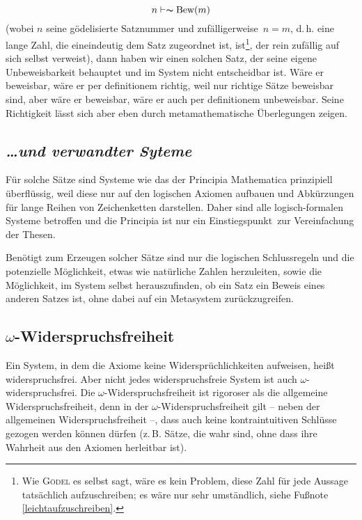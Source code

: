 $$
n \vdash \thicksim \text{Bew}\left(m\right)
$$
(wobei $n$ seine gödelisierte Satznummer und \frq zufälligerweise\flq\ $n = m$,
d.\,h. eine lange Zahl, die eineindeutig dem
Satz zugeordnet ist, ist\footnote{Wie \textsc{Gödel} es selbst sagt, wäre es kein
Problem, diese Zahl für jede Aussage tatsächlich
aufzuschreiben; es wäre nur sehr umständlich,
siehe Fußnote \ref{leichtaufzuschreiben}.}, der rein zufällig auf sich selbst verweist),
dann haben wir einen solchen Satz, der seine eigene Unbeweisbarkeit
behauptet und im System nicht entscheidbar ist. Wäre er beweisbar, wäre er per definitionem
richtig, weil nur richtige Sätze beweisbar sind, aber wäre er beweisbar, wäre er auch
per definitionem unbeweisbar. Seine Richtigkeit lässt sich aber eben durch
metamathematische Überlegungen zeigen.

\subsection*{\frq\textit{\dots und verwandter Syteme}\flq}

Für solche Sätze sind Systeme wie das der Principia Mathematica prinzipiell
überflüssig,
weil diese nur auf den logischen Axiomen aufbauen und Abkürzungen für lange Reihen von
Zeichenketten darstellen. Daher sind alle logisch-formalen Systeme betroffen und die
Principia ist nur ein \frq Einstiegspunkt\flq\ zur Vereinfachung der Thesen.

Benötigt zum Erzeugen solcher Sätze sind nur die logischen Schlussregeln und die
potenzielle Möglichkeit, etwas wie natürliche Zahlen herzuleiten, sowie die Möglichkeit,
im System selbst herauszufinden, ob ein Satz ein Beweis eines anderen Satzes ist, ohne dabei
auf ein Metasystem zurückzugreifen.

\subsection*{$\omega$-Widerspruchsfreiheit}

Ein System, in dem die Axiome keine Widersprüchlichkeiten aufweisen, heißt
\frq widerspruchsfrei\flq. Aber nicht jedes widerspruchsfreie System ist auch
$\omega$-widerspruchsfrei. Die $\omega$-Widerspruchsfreiheit ist rigoroser als
die allgemeine Widerspruchsfreiheit, denn in der $\omega$-Widerspruchsfreiheit
gilt -- neben der allgemeinen Widerspruchsfreiheit --, dass auch keine kontraintuitiven
Schlüsse gezogen werden können dürfen (z.\,B. Sätze, die wahr sind, ohne dass
ihre Wahrheit aus den Axiomen herleitbar ist).

